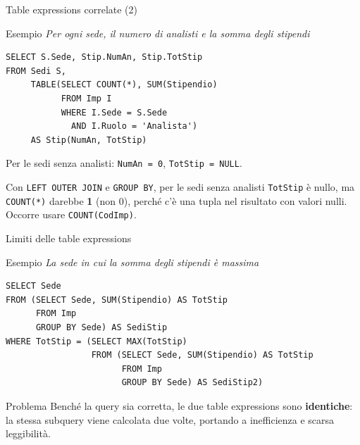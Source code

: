 \documentclass[aspectratio=169]{beamer}
\begin{document}
\begin{frame}[fragile]{Table expressions correlate (2)}

\begin{block}{Esempio}
\textit{Per ogni sede, il numero di analisti e la somma degli stipendi}
\end{block}

\begin{lstlisting}
SELECT S.Sede, Stip.NumAn, Stip.TotStip
FROM Sedi S,
     TABLE(SELECT COUNT(*), SUM(Stipendio)
           FROM Imp I
           WHERE I.Sede = S.Sede
             AND I.Ruolo = 'Analista')
     AS Stip(NumAn, TotStip)
\end{lstlisting}

\vspace{4pt}
Per le sedi senza analisti: \texttt{NumAn = 0}, \texttt{TotStip = NULL}.

\vspace{4pt}
Con \texttt{LEFT OUTER JOIN} e \texttt{GROUP BY}, per le sedi senza analisti \texttt{TotStip} è nullo, ma \texttt{COUNT(*)} darebbe \textbf{1} (non 0), perché c'è una tupla nel risultato con valori nulli. Occorre usare \texttt{COUNT(CodImp)}.

\end{frame}

\begin{frame}[fragile]{Limiti delle table expressions}

\begin{block}{Esempio}
\textit{La sede in cui la somma degli stipendi è massima}
\end{block}

\begin{lstlisting}
SELECT Sede
FROM (SELECT Sede, SUM(Stipendio) AS TotStip
      FROM Imp
      GROUP BY Sede) AS SediStip
WHERE TotStip = (SELECT MAX(TotStip)
                 FROM (SELECT Sede, SUM(Stipendio) AS TotStip
                       FROM Imp
                       GROUP BY Sede) AS SediStip2)
\end{lstlisting}

\begin{alertblock}{Problema}
Benché la query sia corretta, le due table expressions sono \textbf{identiche}: la stessa subquery viene calcolata \alert{due volte}, portando a inefficienza e scarsa leggibilità.
\end{alertblock}

\end{frame}
\end{document}
